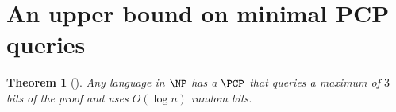 \documentclass[english,12pt]{reedthesis}
\theoremstyle{plain}
\newtheorem{thm}{Theorem}[section]
\theoremstyle{definition}
\newtheorem{defn}[defn]{Definition}
\theoremstyle{remark}
\begin{document}
\section{An upper bound on minimal PCP queries}\label{sec:pcp-query-complexity}

\begin{thm}[{\cite{Has97}}]\label{thm:pcp-max-queries}
  Any language in $\NP$ has a $\PCP$ that queries a maximum of $3$ bits of the
  proof and uses $O(\log n)$ random bits.
\end{thm}







\end{document}
